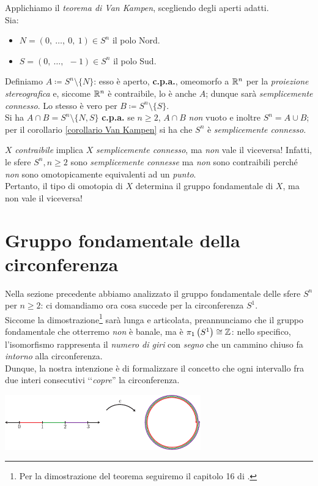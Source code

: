 \begin{demonstration}
	Applichiamo il \textit{teorema di Van Kampen}, scegliendo degli aperti adatti.\\
	Sia:
	\begin{itemize}
		\item $N=(0,\ \dots,\ 0,\ 1)\in S^n$ il polo Nord.
		\item $S=(0,\ \dots,\ \ -1)\in S^n$ il polo Sud.
	\end{itemize}
	Definiamo $A\coloneqq S^n\setminus\{N\}$: esso è aperto, \textbf{c.p.a.}, omeomorfo a $\mathbb{R}^n$ per la \textit{proiezione stereografica} e, siccome $\mathbb{R}^n$ è contraibile, lo è anche $A$; dunque sarà \textit{semplicemente connesso}. Lo stesso è vero per $B\coloneqq S^n\setminus\{S\}$.\\
	Si ha $A\cap B=S^n\setminus\{N, S\}$ \textbf{c.p.a.} se $n\geq 2$, $A\cap B$ \textit{non} vuoto e inoltre $S^n=A\cup B$; per il corollario \ref{corollario Van Kampen} si ha che $S^n$ è \textit{semplicemente connesso}.
\end{demonstration}

\begin{attention}
	$X$ \textit{contraibile} implica $X$ \textit{semplicemente connesso}, ma \textit{non} vale il viceversa! Infatti, le sfere $S^n, n\geq 2$ sono \textit{semplicemente connesse} ma \textit{non} sono contraibili perché \textit{non} sono omotopicamente equivalenti ad un \textit{punto}.\\
	Pertanto, il tipo di omotopia di $X$ determina il gruppo fondamentale di $X$, ma non vale il viceversa!
\end{attention}

\section{Gruppo fondamentale della circonferenza}
Nella sezione precedente abbiamo analizzato il gruppo fondamentale delle sfere $S^n$ per $n\geq 2$: ci domandiamo ora cosa succede per la circonferenza $S^1$. \\
Siccome la dimostrazione\footnote{Per la dimostrazione del teorema seguiremo il capitolo 16 di \cite{kosniowski:1980firstlook}.} sarà lunga e articolata, preannunciamo che il gruppo fondamentale che otterremo \textit{non} è banale, ma è $\gruf{S^1}{\ }\cong \integerset$: nello specifico, l'isomorfismo rappresenta il \textit{numero di giri} con \textit{segno} che un cammino chiuso fa \textit{intorno} alla circonferenza.\\
Dunque, la nostra intenzione è di formalizzare il concetto che ogni intervallo fra due interi consecutivi ‘‘\textit{copre}'' la circonferenza.
\begin{center}
	\includegraphics[width=240pt]{images/slinky-eps-converted-to.pdf}
\end{center}
